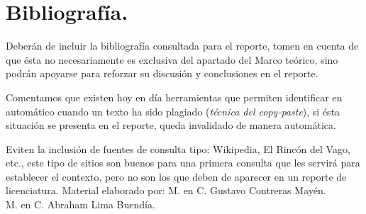 \section{Bibliografía.}
Deberán de incluir la bibliografía consultada para el reporte, tomen en cuenta de que ésta no necesariamente es exclusiva del apartado del Marco teórico, sino podrán apoyarse para reforzar su discusión y conclusiones en el reporte.
\par
Comentamos que existen hoy en día herramientas que permiten identificar en automático cuando un texto ha sido plagiado (\emph{técnica del copy-paste}), si ésta situación se presenta en el reporte, queda invalidado de manera automática.
\par
Eviten la inclusión de fuentes de consulta tipo: Wikipedia, El Rincón del Vago, etc., este tipo de sitios son buenos para una primera consulta que les servirá para establecer el contexto, pero no son los que deben de aparecer en un reporte de licenciatura.
\vfill
\small{Material elaborado por: M. en C. Gustavo Contreras Mayén. \\ \hspace*{4.57cm} M. en C. Abraham Lima Buendía.}

